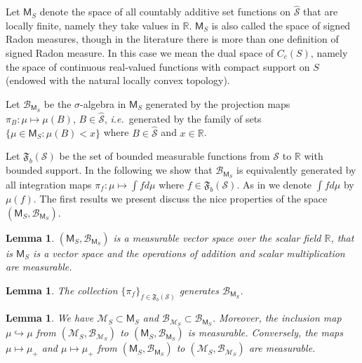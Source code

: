 \documentclass{article}
\theoremstyle{plain}
\newtheorem{lemma}[theorem]{Lemma}
\theoremstyle{remark}
\begin{document}
Let $\mathsf{M}_{S}$ denote the space of all countably additive set functions on $\hat{\mathcal{S}}$ that are locally finite, namely they take values in $\mathbb{R}$. $\mathsf{M}_{S}$ is also called the space of signed Radon measures, though in the literature there is more than one definition of signed Radon measure. In this case we mean the dual space of $C_c(S)$, namely the space of continuous real-valued functions with compact support on $S$ (endowed with the natural locally convex topology). 

Let $\mathcal{B}_{\mathsf{M}_S}$ be the $\sigma$-algebra in $\mathsf{M}_S$ generated by the projection maps $\pi_{B}:\mu\mapsto\mu(B)$, $B\in\hat{\mathcal{S}}$, \textit{i.e.}~generated by the family of sets $\{\mu\in\mathsf{M}_S:\mu(B)<x\}$ where $B\in\hat{\mathcal{S}}$ and $x\in\mathbb{R}$. 

Let $\mathfrak{F}_{b}(\mathcal{S})$ be the set of bounded measurable functions from $\mathcal{S}$ to $\mathbb{R}$ with bounded support. In the following we show that $\mathcal{B}_{\mathsf{M}_S}$ is equivalently generated by all integration maps $\pi_f:\mu\mapsto\int fd\mu$ where $f\in\mathfrak{F}_{b}(\mathcal{S})$. As in \citet{Kallenberg2} we denote $\int fd\mu$ by $\mu(f)$. The first results we present discuss the nice properties of the space $(\mathsf{M}_{S},\mathcal{B}_{\mathsf{M}_S})$.

\begin{lemma}\label{lem-measurable-vector-space}
	$(\mathsf{M}_{S},\mathcal{B}_{\mathsf{M}_S})$ is a measurable vector space over the scalar field $\mathbb{R}$, that is $\mathsf{M}_{S}$ is a vector space and the operations of addition and scalar multiplication are measurable.
\end{lemma}



\begin{lemma}\label{lem-uncited-1}
	The collection $\{\pi_f\}_{f\in\mathfrak{F}_{b}(\mathcal{S})}$ generates $\mathcal{B}_{\mathsf{M}_S}$.
\end{lemma}


\begin{lemma}\label{lem-inclusion}
	We have $\mathcal{M}_{S}\subset\mathsf{M}_{S}$ and $\mathcal{B}_{\mathcal{M}_S}\subset \mathcal{B}_{\mathsf{M}_S}$. Moreover, the inclusion map $\mu\hookrightarrow\mu$ from $(\mathcal{M}_{S},\mathcal{B}_{\mathcal{M}_S})$ to $(\mathsf{M}_{S},\mathcal{B}_{\mathsf{M}_S})$ is measurable. Conversely, the maps $\mu\mapsto\mu_+$ and $\mu\mapsto\mu_+$ from $(\mathsf{M}_{S},\mathcal{B}_{\mathsf{M}_S})$ to $(\mathcal{M}_{S},\mathcal{B}_{\mathcal{M}_S})$ are measurable.
\end{lemma}
\end{document}
